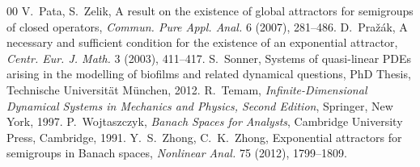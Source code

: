 \documentclass[a4paper,12pt,reqno]{amsart}
\theoremstyle{plain}
\theoremstyle{definition}
\numberwithin{equation}{section}
\begin{document}
\begin{thebibliography}{00}
%
V.~Pata, S.~Zelik,
A result on the existence of global attractors for semigroups of closed operators,
\textit{Commun. Pure Appl. Anal.} 6 (2007), 281--486.
%
D.~Pra\v{z}\'ak,
A necessary and sufficient condition for the existence of an exponential attractor,
\textit{Centr. Eur. J. Math.} 3 (2003), 411--417.
%
S.~Sonner,
Systems of quasi-linear PDEs arising in the modelling of biofilms and related dynamical questions,
PhD Thesis, Technische Universit\"at M\"unchen, 2012.
%
R.~Temam,
\textit{Infinite-Dimensional Dynamical Systems in Mechanics and Physics, Second Edition},
Springer, New York, 1997.
%
P.~Wojtaszczyk,
\textit{Banach Spaces for Analysts},
Cambridge University Press, Cambridge, 1991.
%
Y.~S.~Zhong, C.~K.~Zhong,
Exponential attractors for semigroups in Banach spaces,
\textit{Nonlinear Anal.} 75 (2012), 1799--1809.
\end{thebibliography}
\end{document}
